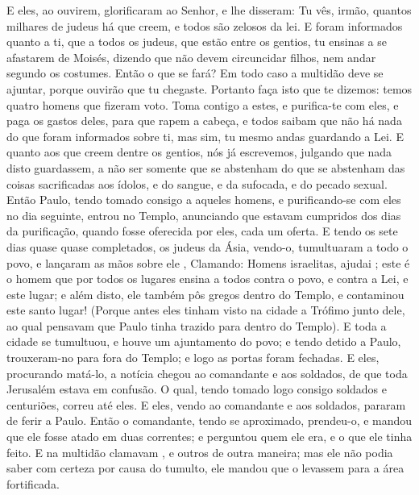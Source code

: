 {  E eles, ao ouvirem, glorificaram ao Senhor, e lhe disseram: Tu vês, irmão, quantos milhares de judeus há que creem, e todos são zelosos da lei.
  E foram informados quanto a ti, que a todos os judeus, que estão entre os gentios,
{} tu ensinas a se afastarem de Moisés, dizendo que não devem circuncidar
{} filhos, nem andar segundo os costumes.
  Então o que se fará? Em todo caso a multidão deve se ajuntar, porque ouvirão que tu
{} chegaste.
  Portanto faça isto que te dizemos: temos quatro homens que fizeram voto.
  Toma contigo a estes, e purifica-te com eles, e paga os gastos deles, para que rapem a cabeça, e todos saibam que não há nada do que foram informados sobre ti, mas sim,
{} tu mesmo andas guardando a Lei.
  E quanto aos que creem dentre os gentios, nós já escrevemos, julgando que nada disto guardassem, a não ser somente que se abstenham do que se abstenham das coisas sacrificadas aos ídolos, e do sangue, e da
{} sufocada, e do pecado sexual.
  Então Paulo, tendo tomado consigo a aqueles homens, e purificando-se com eles no dia seguinte, entrou no Templo, anunciando que
{} estavam cumpridos dos dias da purificação, quando fosse oferecida por eles, cada um
{} oferta.
  E tendo os sete dias quase quase completados, os judeus da Ásia, vendo-o, tumultuaram a todo o povo, e lançaram as mãos sobre ele
{}, 
  Clamando: Homens israelitas, ajudai
{} ; este é o homem que por todos os lugares ensina a todos contra o
{} povo, e contra a Lei, e
{} este lugar; e além disto, ele também pôs gregos dentro do Templo, e contaminou este santo lugar!
  (Porque antes eles tinham visto na cidade a Trófimo junto dele, ao qual pensavam que Paulo tinha trazido para dentro do Templo).
  E toda a cidade se tumultuou, e houve um ajuntamento do povo; e tendo detido a Paulo, trouxeram-no para fora do Templo; e logo as portas foram fechadas.
  E eles, procurando matá-lo, a notícia chegou ao comandante e aos soldados, de que toda Jerusalém estava em confusão.
  O qual, tendo tomado logo consigo soldados e centuriões, correu até eles. E eles, vendo ao comandante e aos soldados, pararam de ferir a Paulo.
  Então o comandante, tendo se aproximado, prendeu-o, e mandou que ele fosse atado em duas correntes; e perguntou quem ele era, e o que ele tinha feito.
  E na multidão clamavam
{}, e outros de outra maneira; mas
{} ele não podia saber com certeza por causa do tumulto, ele mandou que o levassem para a área fortificada.
}
